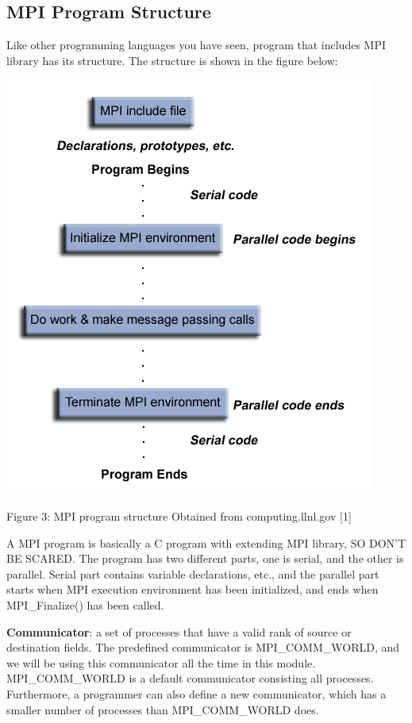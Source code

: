 \documentclass[letterpaper,10pt,openany,oneside]{sphinxmanual}
\begin{document}
\subsection{MPI Program Structure}
\label{introMPI/introMPI:mpi-program-structure}
Like other programming languages you have seen, program that includes MPI library has its structure. The structure is shown in the figure below:

{\hfill\includegraphics{MPIstructure.png}\hfill}

\begin{center}Figure 3: MPI program structure Obtained from computing.llnl.gov {[}1{]}
\end{center}
A MPI program is basically a C program with extending MPI library, SO DON’T BE SCARED. The program has two different parts, one is serial, and the other is parallel. Serial part contains variable declarations, etc., and the parallel part starts when MPI execution environment has been initialized, and ends when MPI\_Finalize() has been called.

\textbf{Communicator}: a set of processes that have a valid rank of source or destination fields. The predefined communicator is MPI\_COMM\_WORLD, and we will be using this communicator all the time in this module. MPI\_COMM\_WORLD is a default communicator consisting all processes. Furthermore, a programmer can also define a new communicator, which has a smaller number of processes than MPI\_COMM\_WORLD does.
\end{document}
